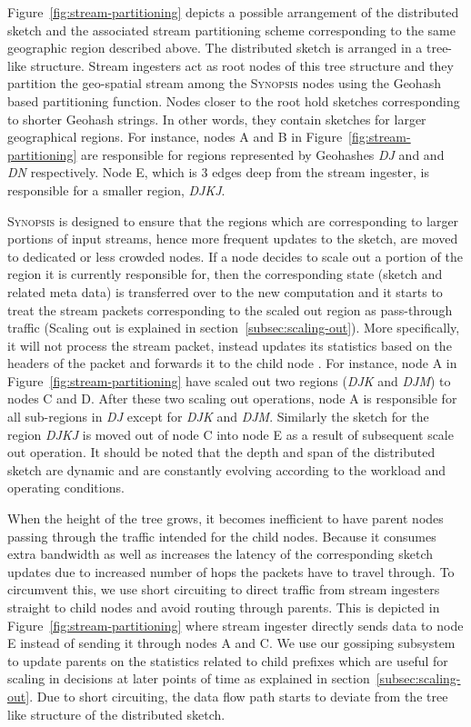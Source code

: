 Figure~\ref{fig:stream-partitioning} depicts a possible arrangement of the distributed sketch and the associated stream partitioning scheme corresponding to the same geographic region described above.
The distributed sketch is arranged in a tree-like structure.
Stream ingesters act as root nodes of this tree structure and they partition the geo-spatial stream among the \textsc{Synopsis} nodes using the Geohash based partitioning function.
Nodes closer to the root hold sketches corresponding to shorter Geohash strings.
In other words, they contain sketches for larger geographical regions.
For instance, nodes A and B in Figure~\ref{fig:stream-partitioning} are responsible for regions represented by Geohashes \emph{DJ} and and \emph{DN} respectively.
Node E, which is 3 edges deep from the stream ingester, is responsible for a smaller region, \emph{DJKJ}.

\textsc{Synopsis} is designed to ensure that the regions which are corresponding to larger portions of input streams, hence more frequent updates to the sketch, are moved to dedicated or less crowded nodes.
If a node decides to scale out a portion of the region it is currently responsible for, then the corresponding state (sketch and related meta data) is transferred over to the new computation and it starts to treat the stream packets corresponding to the scaled out region as pass-through traffic (Scaling out is explained in section~\ref{subsec:scaling-out}).
More specifically, it will not process the stream packet, instead updates its statistics based on the headers of the packet and forwards it to the child node . 
For instance, node A in Figure~\ref{fig:stream-partitioning} have scaled out two regions (\emph{DJK} and \emph{DJM}) to nodes C and D.
After these two scaling out operations, node A is responsible for all sub-regions in \emph{DJ} except for \emph{DJK} and \emph{DJM}.
Similarly the sketch for the region \emph{DJKJ} is moved out of node C into node E as a result of subsequent scale out operation.
It should be noted that the depth and span of the distributed sketch are dynamic and are constantly evolving according to the workload and operating conditions.

When the height of the tree grows, it becomes inefficient to have parent nodes passing through the traffic intended for the child nodes. 
Because it consumes extra bandwidth as well as increases the latency of the  corresponding sketch updates due to increased number of hops the packets have to travel through.
To circumvent this, we use short circuiting to direct traffic from stream ingesters straight to child nodes and avoid routing through parents.
This is depicted in Figure~\ref{fig:stream-partitioning} where stream ingester directly sends data to node E instead of sending it through nodes A and C.
We use our gossiping subsystem to update parents on the statistics related to child prefixes which are useful for scaling in decisions at later points of time as explained in section~\ref{subsec:scaling-out}.
Due to short circuiting, the data flow path starts to deviate from the tree like structure of the distributed sketch.

